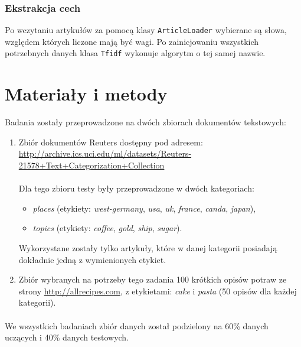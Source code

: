\documentclass{classrep}
\begin{document}
\subsubsection{Ekstrakcja cech}
Po wczytaniu artykułów za pomocą klasy \verb|ArticleLoader| wybierane są słowa, względem których liczone mają być wagi. Po zainicjowaniu wszystkich potrzebnych danych klasa \verb|Tfidf| wykonuje algorytm o tej samej nazwie.

\section{Materiały i metody}
Badania zostały przeprowadzone na dwóch zbiorach dokumentów tekstowych:\\
\begin{enumerate}
\item Zbiór dokumentów Reuters dostępny pod adresem:\\ \url{http://archive.ics.uci.edu/ml/datasets/Reuters-21578+Text+Categorization+Collection}\\\\
Dla tego zbioru testy były przeprowadzone w dwóch kategoriach:

\begin{itemize}
\item \textit{places} (etykiety: \textit{west-germany}, \textit{usa}, \textit{uk}, \textit{france}, \textit{canda}, \textit{japan}),
\item \textit{topics} (etykiety: \textit{coffee}, \textit{gold}, \textit{ship}, \textit{sugar}).\\
\end{itemize}
Wykorzystane zostały tylko artykuły, które w danej kategorii posiadają dokładnie jedną z wymienionych etykiet.\\


\item Zbiór wybranych na potrzeby tego zadania 100 krótkich opisów potraw ze strony \url{http://allrecipes.com}, z etykietami: \textit{cake} i \textit{pasta} (50 opisów dla każdej kategorii).

\end{enumerate}

\paragraph{}
We wszystkich badaniach zbiór danych został podzielony na 60\% danych uczących i 40\% danych testowych.
\end{document}
